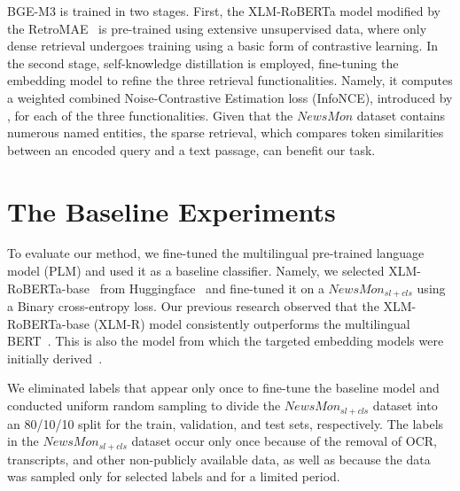 BGE-M3 is trained in two stages.
First, the XLM-RoBERTa model modified by the RetroMAE~\parencite{xiao2022retromae} is pre-trained using extensive unsupervised data, where only dense retrieval undergoes training using a basic form of contrastive learning. 
In the second stage, self-knowledge distillation is employed, fine-tuning the embedding model to refine the three retrieval functionalities.
Namely, it computes a weighted combined Noise-Contrastive Estimation loss (InfoNCE), introduced by \textcite{oord2019representationlearningcontrastivepredictive}, for each of the three functionalities.
Given that the $NewsMon$ dataset contains numerous named entities, the sparse retrieval, which compares token similarities between an encoded query and a text passage, can benefit our task.

\section{The Baseline Experiments}

To evaluate our method, we fine-tuned the multilingual pre-trained language model (PLM) and used it as a baseline classifier.
Namely, we selected XLM-RoBERTa-base~\parencite{conneau2019xlmr} from Huggingface~\parencite{wolf-etal-2020-transformers} and fine-tuned it on a $NewsMon_{sl+cls}$ using a Binary cross-entropy loss. 
Our previous research observed that the XLM-RoBERTa-base (XLM-R) model consistently outperforms the multilingual BERT~\parencite{ivacic2024comparing}. 
This is also the model from which the targeted embedding models were initially derived~\parencite{chen2024bgem3embeddingmultilingualmultifunctionality, wang2024multilinguale5textembeddings}.

We eliminated labels that appear only once to fine-tune the baseline model and conducted uniform random sampling to divide the $NewsMon_{sl+cls}$ dataset into an 80/10/10 split for the train, validation, and test sets, respectively. 
The labels in the $NewsMon_{sl+cls}$ dataset occur only once because of the removal of OCR, transcripts, and other non-publicly available data, as well as because the data was sampled only for selected labels and for a limited period.

